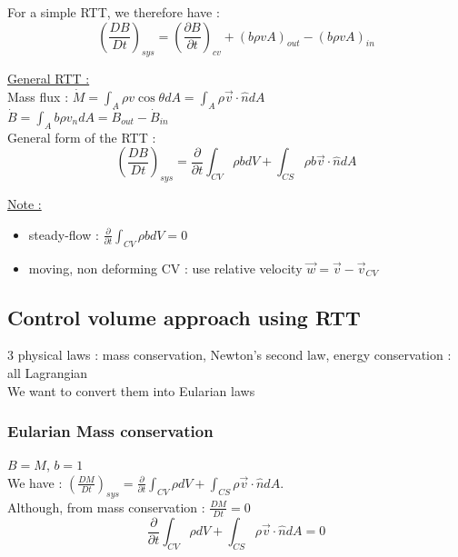 \documentclass[../main.tex]{subfiles}
\begin{document}
For a simple RTT, we therefore have : \\
\begin{equation}
    (\frac{DB}{Dt})_{sys} = (\frac{\partial B}{\partial t})_{cv} + (b\rho v A)_{out} - (b\rho v A)_{in}
\end{equation}

\quad \underline{General RTT :}\\
Mass flux : $\dot{M} = \int_A \rho v \cos{\theta} dA = \int_A \rho \Vec{v}\cdot \hat{n}dA$\\
$\dot{B} = \int_A b \rho v_ndA = \dot{B}_{out}-\dot{B}_{in}$\\

General form of the RTT :\\
\begin{equation}
    (\frac{DB}{Dt})_{sys} = \frac{\partial}{\partial t} \int_{CV} \rho b dV + \int_{CS} \rho b \Vec{v}\cdot \hat{n}dA
\end{equation}

\color{gray}\underline{Note :}\begin{itemize}
    \item steady-flow : $\frac{\partial}{\partial t}\int_{CV} \rho b dV = 0$\\
    \item moving, non deforming CV : use relative velocity $\Vec{w} = \Vec{v}-\Vec{v}_{CV}$\\
\end{itemize}
\color{black}

\subsection{Control volume approach using RTT}
3 physical laws : mass conservation, Newton's second law, energy conservation : all Lagrangian\\
We want to convert them into Eularian laws\\

\subsubsection{Eularian Mass conservation}
$B = M$, $b=1$\\
We have : $(\frac{DM}{Dt})_{sys} = \frac{\partial}{\partial t} \int_{CV} \rho dV + \int_{CS} \rho \Vec{v}\cdot \hat{n}dA$.\\
Although, from mass conservation : $\frac{DM}{Dt} = 0$\\

\begin{equation}
    \frac{\partial}{\partial t} \int_{CV} \rho dV + \int_{CS} \rho \Vec{v} \cdot \hat{n}dA=0
\end{equation}
\end{document}
